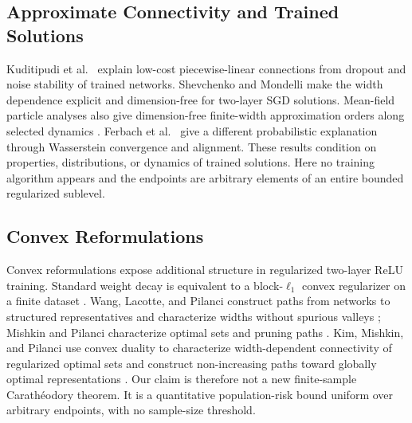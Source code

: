\documentclass[smallextended,envcountsect]{svjour3}
\begin{document}
\subsection{Approximate Connectivity and Trained Solutions}
Kuditipudi et al.~\cite{Kuditipudi2019} explain low-cost piecewise-linear connections from dropout and noise stability of trained networks. Shevchenko and Mondelli \cite{ShevchenkoMondelli2020} make the width dependence explicit and dimension-free for two-layer SGD solutions. Mean-field particle analyses also give dimension-free finite-width approximation orders along selected dynamics \cite{RotskoffVandenEijnden2022}. Ferbach et al.~\cite{Ferbach2024} give a different probabilistic explanation through Wasserstein convergence and alignment. These results condition on properties, distributions, or dynamics of trained solutions. Here no training algorithm appears and the endpoints are arbitrary elements of an entire bounded regularized sublevel.

\subsection{Convex Reformulations}
Convex reformulations expose additional structure in regularized two-layer ReLU training. Standard weight decay is equivalent to a block-$\ell_1$ convex regularizer on a finite dataset \cite{PilanciErgen2020}. Wang, Lacotte, and Pilanci construct paths from networks to structured representatives and characterize widths without spurious valleys \cite{WangLacottePilanci2022}; Mishkin and Pilanci characterize optimal sets and pruning paths \cite{MishkinPilanci2023}. Kim, Mishkin, and Pilanci use convex duality to characterize width-dependent connectivity of regularized optimal sets and construct non-increasing paths toward globally optimal representations \cite{KimMishkinPilanci2025}. Our claim is therefore not a new finite-sample Carath\'eodory theorem. It is a quantitative population-risk bound uniform over arbitrary endpoints, with no sample-size threshold.
\end{document}
